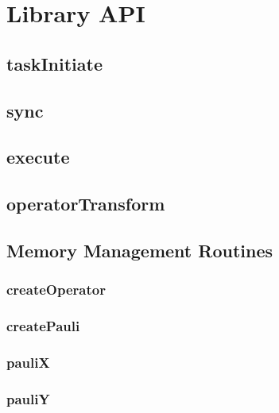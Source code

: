 \documentclass[10pt]{book}
\begin{document}
\section{\qcor Library API}\label{sec:qcor_library_api}
\subsection{\textbf{taskInitiate}}\label{subsec:taskInitiate}


\subsection{\textbf{sync}}\label{subsec:sync}


\subsection{\textbf{execute}}\label{subsec:execute}


\subsection{\textbf{operatorTransform}}\label{subsec:operatortransform}



\subsection{Memory Management Routines}
\subsubsection{\textbf{createOperator}}\label{subsec:createobserv}


\subsubsection{\textbf{createPauli}}\label{subsec:createpauli}


\subsubsection{\textbf{pauliX}}\label{subsec:paulix}


\subsubsection{\textbf{pauliY}}\label{subsec:pauliy}

\end{document}
